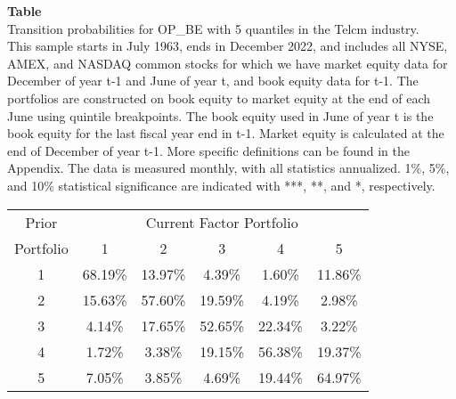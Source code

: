 \begin{table*}[ht!]
\raggedright
{}
\label{tab: transition_probs_OP_BE_Telcm_with_5_quantiles}
\textbf{Table \thetable} \\
Transition probabilities for OP_BE with 5 quantiles in the Telcm industry. \\
\hspace*{1em}This sample starts in July 1963, ends in December 2022, and includes all NYSE, AMEX, and NASDAQ common stocks for which we have market equity data for December of year t-1 and June of year t, and book equity data for t-1. The portfolios are constructed on book equity to market equity at the end of each June using quintile breakpoints.  The book equity used in June of year t is the book equity for the last fiscal year end in t-1.  Market equity is calculated at the end of December of year t-1.  More specific definitions can be found in the Appendix.  The data is measured monthly, with all statistics annualized.  1\%, 5\%, and 10\% statistical significance are indicated with ***, **, and *, respectively. \\
\vspace{0.5em}
\centering
\begin{adjustbox}{max width=\textwidth}
\begin{tabular}{@{}cccccc@{}}
\toprule
Prior & \multicolumn{5}{c}{Current Factor Portfolio} \\
Portfolio & 1 & 2 & 3 & 4 & 5 \\
\midrule
1 & 68.19\% & 13.97\% & 4.39\% & 1.60\% & 11.86\% \\
2 & 15.63\% & 57.60\% & 19.59\% & 4.19\% & 2.98\% \\
3 & 4.14\% & 17.65\% & 52.65\% & 22.34\% & 3.22\% \\
4 & 1.72\% & 3.38\% & 19.15\% & 56.38\% & 19.37\% \\
5 & 7.05\% & 3.85\% & 4.69\% & 19.44\% & 64.97\% \\
\bottomrule
\end{tabular}
\end{adjustbox}
\end{table*}
